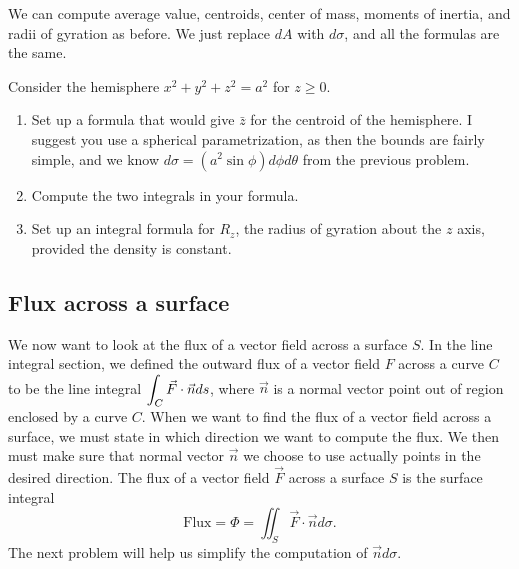 We can compute average value, centroids, center of mass, moments of inertia, and radii of gyration as before.  We just replace $dA$ with $d\sigma$, and all the formulas are the same. 


\begin{problem}
 Consider the hemisphere $x^2+y^2+z^2=a^2$ for $z\geq 0$. 
\begin{enumerate}
 \item Set up a formula that would give $\bar z$ for the centroid of the hemisphere. I suggest you use a spherical parametrization, as then the bounds are fairly simple, and we know $d\sigma = (a^2\sin\phi) d\phi d\theta$ from the previous problem.
 \item Compute the two integrals in your formula. %
 \item Set up an integral formula for $R_z$, the radius of gyration about the $z$ axis, provided the density is constant.
\end{enumerate}
\end{problem}

\subsection{Flux across a surface}

We now want to look at the flux of a vector field across a surface $S$.  In the line integral section, we defined the outward flux of a vector field $F$ across a curve $C$ to be the line integral $\displaystyle \int_C \vec F\cdot \vec n ds$, where $\vec n$ is a normal vector point out of region enclosed by a curve $C$. When we want to find the flux of a vector field across a surface, we must state in which direction we want to compute the flux. We then must make sure that normal vector $\vec n$ we choose to use actually points in the desired direction. The flux of a vector field $\vec F$ across a surface $S$ is the surface integral
$$\text{Flux}=\Phi 
= \iint_S \vec F\cdot \vec n d\sigma 
.$$
The next problem will help us simplify the computation of $\vec nd\sigma$.


